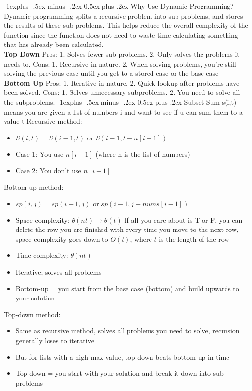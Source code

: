 \documentclass[letterpaper, 8pt]{extarticle}
\makeatletter
\renewcommand{\subsection}{\@startsection{subsection}{2}{0mm}%
                                {-1explus -.5ex minus -.2ex}%
                                {0.5ex plus .2ex}%
                                {\normalfont\small\bfseries}}
\makeatother
\begin{document}
\begin{multicols*}{5}
\subsection{Why Use Dynamic Programming?}
Dynamic programming splits a recursive problem into sub problems, and stores the results of these sub problems. This helps reduce the overall complexity of the function since the function does not need to waste time calculating something that has already been calculated.\\ \textbf{Top Down} Pros: 1. Solves fewer sub problems. 2. Only solves the problems it needs to.
Cons: 1. Recursive in nature. 2. When solving problems, you're still solving the previous case until you get to a stored case or the base case \\
\textbf{Bottom Up} Pros: 1. Iterative in nature. 2. Quick lookup after problems have been solved. Cons: 1. Solves unnecessary subproblems. 2. You need to solve all the subproblems.
\subsection{Subset Sum}
s(i,t) means you are given a list of numbers i and want to see if u can sum them to a value t
Recursive method:
\begin{itemize}
    \item $S(i, t) = S(i - 1, t)$ or $S(i - 1, t-n[i-1])$
    \item Case 1: You use $n[i-1]$ (where n is the list of numbers)
    \item Case 2: You don't use $n[i-1]$
\end{itemize}

Bottom-up method:
\begin{itemize}
    \item $sp(i, j) = sp(i-1, j)$ or $sp(i-1,j-nums[i-1])$
    \item Space complexity: $\theta(nt) \rightarrow \theta(t)$ If all you care about is T or F, you can delete the row you are finished with every time you move to the next row, space complexity goes down to $O(t)$, where $t$ is the length of the row
    \item Time complexity: $\theta(nt)$
    \item Iterative; solves all problems
    \item Bottom-up = you start from the base case (bottom) and build upwards to your solution
\end{itemize}

Top-down method:
\begin{itemize}
    \item Same as recursive method, solves all problems you need to solve, recursion generally loses to iterative
    \item But for lists with a high max value, top-down beats bottom-up in time
    \item Top-down = you start with your solution and break it down into sub problems
\end{itemize}



\end{multicols*}
\end{document}

